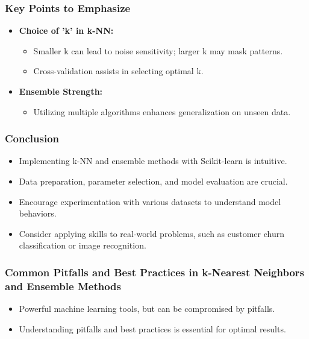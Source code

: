 \documentclass[aspectratio=169]{beamer}
\begin{document}
\begin{frame}
    \frametitle{Key Points to Emphasize}
    \begin{itemize}
        \item \textbf{Choice of 'k' in k-NN:} 
        \begin{itemize}
            \item Smaller k can lead to noise sensitivity; larger k may mask patterns.
            \item Cross-validation assists in selecting optimal k.
        \end{itemize}
        \item \textbf{Ensemble Strength:} 
        \begin{itemize}
            \item Utilizing multiple algorithms enhances generalization on unseen data.
        \end{itemize}
    \end{itemize}
\end{frame}

\begin{frame}
    \frametitle{Conclusion}
    \begin{itemize}
        \item Implementing k-NN and ensemble methods with Scikit-learn is intuitive.
        \item Data preparation, parameter selection, and model evaluation are crucial.
        \item Encourage experimentation with various datasets to understand model behaviors.
        \item Consider applying skills to real-world problems, such as customer churn classification or image recognition.
    \end{itemize}
\end{frame}

\begin{frame}[fragile]
    \frametitle{Common Pitfalls and Best Practices in k-Nearest Neighbors and Ensemble Methods}
    \begin{itemize}
        \item Powerful machine learning tools, but can be compromised by pitfalls.
        \item Understanding pitfalls and best practices is essential for optimal results.
    \end{itemize}
\end{frame}
\end{document}
